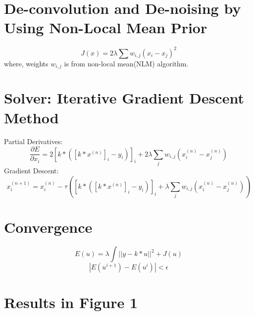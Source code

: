 \documentclass[paper=a4, fontsize=11pt]{scrartcl}
\begin{document}
\section{De-convolution and De-noising by Using Non-Local Mean Prior}
\begin{equation}
  J(x)=2\lambda \sum{w_{i,j}{(x_i-x_j)}^2}
\end{equation}
where, weights $w_{i,j}$ is from non-local mean(NLM) algorithm.

\section{Solver: Iterative Gradient Descent Method}
Partial Derivatives:
\begin{equation}
\frac{\partial E}{\partial x_i} = 2 {\left[k \ast \left({[k \ast x^{(n)}]}_i-y_i \right)\right]}_i + 2 \lambda \sum_{j}{w_{i,j}{(x_i^{(n)}-x_j^{(n)})}}
\end{equation}
Gradient Descent:
\begin{equation}
x_i^{(n+1)}= x_i^{(n)}-\tau \left( {\left[k \ast \left({[k \ast x^{(n)}]}_i-y_i \right)\right]}_i  +\lambda \sum_{j}{w_{i,j}{(x_i^{(n)}-x_j^{(n)})}} \right)
\end{equation}

\section{Convergence}
\begin{equation}
E(u) = \lambda \int ||y-k*u||^2 + J(u)
\end{equation}
\begin{equation}
|E(u^{i+1})-E(u^{i})| < \epsilon
\end{equation}

\section{Results in Figure 1}
\end{document}
